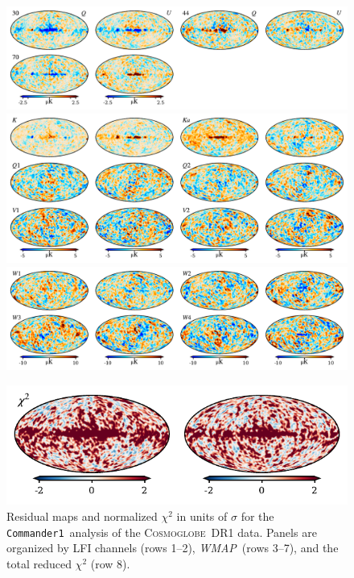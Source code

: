 \documentclass[twocolumn]{../../common/aa}
\def\WMAP{\emph{WMAP}}
\def\commanderone{\texttt{Commander1}}
\newcommand{\cosmoglobe}{\textsc{Cosmoglobe}}
\begin{document}
\begin{figure}
	\begin{center}
	\includegraphics[width=\linewidth]{figures/comm1_res_QU_LFI.pdf}\vspace{-0.3cm}
	\includegraphics[width=\linewidth]{figures/comm1_res_QU_K-V.pdf}\vspace{-0.3cm}
	\includegraphics[width=\linewidth]{figures/comm1_res_QU_W.pdf}\vspace{-0.3cm}
	\end{center}\vspace{-0.3cm}
	\includegraphics[width=0.5\linewidth]{figures/comm1_res_QU_chisq.pdf}
	\caption{Residual maps and normalized $\chi^2$ in units of $\sigma$ for the \commanderone\ analysis of the \cosmoglobe\ DR1 data. Panels are organized by LFI channels  (rows 1--2), \WMAP\  (rows 3--7), and the total reduced $\chi^2$ (row 8).}
	\label{fig:res_QU}
\end{figure}
\end{document}
